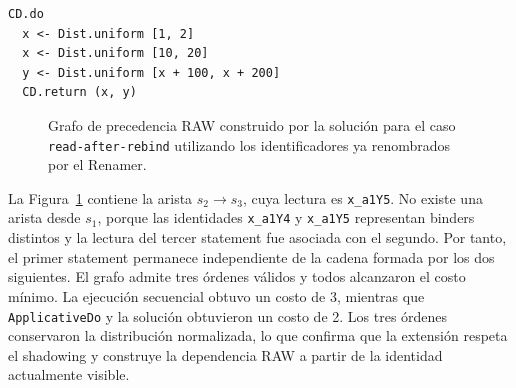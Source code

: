 \begin{lstlisting}[style=haskell,caption={Programa probabilístico asociado al caso \texttt{read-after-rebind}.},label={lst:resultados-shadowing}]
CD.do
  x <- Dist.uniform [1, 2]
  x <- Dist.uniform [10, 20]
  y <- Dist.uniform [x + 100, x + 200]
  CD.return (x, y)
\end{lstlisting}

\begin{figure}[ht]
\centering
\begingroup
\begin{PrecedenceGraph}[node distance=0.45cm and 0.5cm]
\end{PrecedenceGraph}
\endgroup
\caption[Grafo RAW del caso \texttt{read-after-rebind}.]{Grafo de precedencia RAW construido por la solución para el caso \texttt{read-after-rebind} utilizando los identificadores ya renombrados por el Renamer.}
\label{fig:resultados-grafo-shadowing}
\end{figure}

La Figura~\ref{fig:resultados-grafo-shadowing} contiene la arista $s_2\to s_3$, cuya lectura es \texttt{x\_a1Y5}. No existe una arista desde $s_1$, porque las identidades \texttt{x\_a1Y4} y \texttt{x\_a1Y5} representan binders distintos y la lectura del tercer statement fue asociada con el segundo. Por tanto, el primer statement permanece independiente de la cadena formada por los dos siguientes. El grafo admite tres órdenes válidos y todos alcanzaron el costo mínimo. La ejecución secuencial obtuvo un costo de 3, mientras que \texttt{ApplicativeDo} y la solución obtuvieron un costo de 2. Los tres órdenes conservaron la distribución normalizada, lo que confirma que la extensión respeta el shadowing y construye la dependencia RAW a partir de la identidad actualmente visible.
